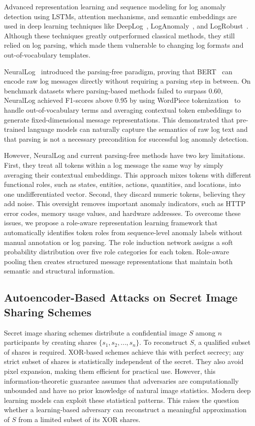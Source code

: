Advanced representation learning and sequence modeling for log anomaly detection using LSTMs, attention mechanisms, and semantic embeddings are used in deep learning techniques like DeepLog~\cite{du2017deeplog}, LogAnomaly~\cite{meng2019loganomaly}, and LogRobust~\cite{zhang2019robust}. Although these techniques greatly outperformed classical methods, they still relied on log parsing, which made them vulnerable to changing log formats and out-of-vocabulary templates.

NeuralLog~\cite{neurallog2021} introduced the parsing-free paradigm, proving that BERT~\cite{devlin2018bert} can encode raw log messages directly without requiring a parsing step in between. On benchmark datasets where parsing-based methods failed to surpass 0.60, NeuralLog achieved F1-scores above 0.95 by using WordPiece tokenization~\cite{schuster2012japanese} to handle out-of-vocabulary terms and averaging contextual token embeddings to generate fixed-dimensional message representations. This demonstrated that pre-trained language models can naturally capture the semantics of raw log text and that parsing is not a necessary precondition for successful log anomaly detection.

However, NeuralLog and current parsing-free methods have two key limitations. First, they treat all tokens within a log message the same way by simply averaging their contextual embeddings. This approach mixes tokens with different functional roles, such as states, entities, actions, quantities, and locations, into one undifferentiated vector. Second, they discard numeric tokens, believing they add noise. This oversight removes important anomaly indicators, such as HTTP error codes, memory usage values, and hardware addresses. To overcome these issues, we propose a role-aware representation learning framework that automatically identifies token roles from sequence-level anomaly labels without manual annotation or log parsing. The role induction network assigns a soft probability distribution over five role categories for each token. Role-aware pooling then creates structured message representations that maintain both semantic and structural information.

\subsection{Autoencoder-Based Attacks on Secret Image Sharing Schemes}

Secret image sharing schemes distribute a confidential image $S$ among $n$ participants by creating shares $\{s_1, s_2, ..., s_n\}$. To reconstruct $S$, a qualified subset of shares is required. XOR-based schemes achieve this with perfect secrecy; any strict subset of shares is statistically independent of the secret. They also avoid pixel expansion, making them efficient for practical use. However, this information-theoretic guarantee assumes that adversaries are computationally unbounded and have no prior knowledge of natural image statistics. Modern deep learning models can exploit these statistical patterns. This raises the question whether a learning-based adversary can reconstruct a meaningful approximation of $S$ from a limited subset of its XOR shares.


